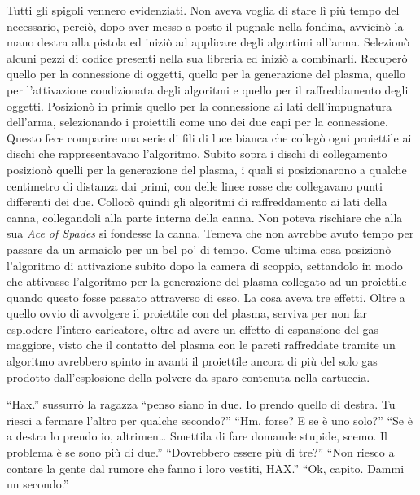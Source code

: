     Tutti gli spigoli vennero evidenziati. Non aveva voglia di stare lì più
    tempo del necessario, perciò, dopo aver messo a posto il pugnale nella
    fondina, avvicinò la mano destra alla pistola ed iniziò ad applicare
    degli algortimi all'arma. Selezionò alcuni pezzi di codice presenti
    nella sua libreria ed iniziò a combinarli. Recuperò quello per la
    connessione di oggetti, quello per la generazione del plasma, quello
    per l'attivazione condizionata degli algoritmi e quello
    per il raffreddamento degli oggetti. Posizionò in primis quello per la
    connessione ai lati dell'impugnatura dell'arma, selezionando i
    proiettili come uno dei due capi per la connessione. Questo fece
    comparire una serie di fili di luce bianca che collegò ogni proiettile
    ai dischi che rappresentavano l'algoritmo. Subito sopra
    i dischi di collegamento posizionò quelli per la generazione del
    plasma, i quali si posizionarono a qualche centimetro di distanza dai
    primi, con delle linee rosse che collegavano punti differenti dei due.
    Collocò quindi gli algoritmi di raffreddamento ai lati della canna,
    collegandoli alla parte interna della canna. Non poteva rischiare che
    alla sua \emph{Ace of Spades} si fondesse la canna. Temeva che non
    avrebbe avuto tempo per passare da un armaiolo per un bel po' di tempo.
    Come ultima cosa posizionò l'algoritmo di attivazione subito dopo la
    camera di scoppio, settandolo in modo che attivasse l'algoritmo per la
    generazione del plasma collegato ad un proiettile quando questo fosse
    passato attraverso di esso. La cosa aveva tre effetti. Oltre a quello
    ovvio di avvolgere il proiettile con del plasma, serviva per non far
    esplodere l'intero caricatore, oltre ad avere un effetto di espansione
    del gas maggiore, visto che il contatto del plasma con le pareti
    raffreddate tramite un algoritmo avrebbero spinto in avanti il
    proiettile ancora di più del solo gas prodotto dall'esplosione della
    polvere da sparo contenuta nella cartuccia.
    
    ``Hax.'' sussurrò la ragazza ``penso siano in due. Io
    prendo quello di destra. Tu riesci a fermare l'altro per qualche
    secondo?'' ``Hm, forse? E se è uno solo?'' ``Se è a destra lo prendo
    io, altrimen\dots{} Smettila di fare domande stupide, scemo. Il
    problema è se sono più di due.'' ``Dovrebbero essere più di tre?''
    ``Non riesco a contare la gente dal rumore che fanno i loro vestiti,
    HAX.'' ``Ok, capito. Dammi un secondo.''

